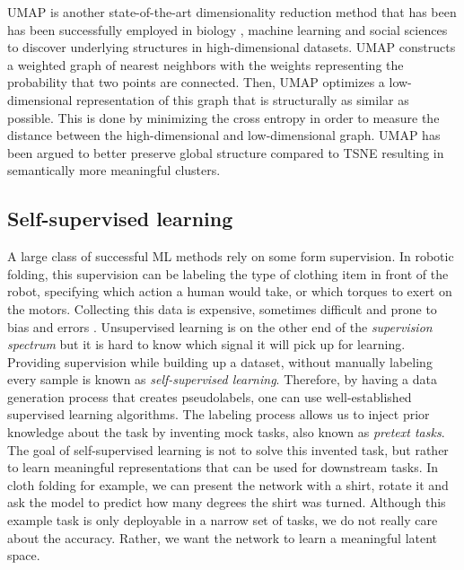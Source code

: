 \documentclass[\home/main.tex]{subfiles}
\begin{document}
\Gls{UMAP} is another state-of-the-art dimensionality reduction method that has been has been successfully employed in biology \autocite{cao2019single}, machine learning \autocite{carter2019activation} and social sciences \autocite{diaz2019umap} to discover underlying structures in high-dimensional datasets. \Gls{UMAP} constructs a weighted graph of nearest neighbors with the weights representing the probability that two points are connected. Then, UMAP optimizes a low-dimensional representation of this graph that is structurally as similar as possible. This is done by minimizing the cross entropy in order to measure the distance between the high-dimensional and low-dimensional graph. \gls{UMAP} has been argued to better preserve global structure compared to \gls{TSNE} \autocite{becht2019dimensionality} resulting in semantically more meaningful clusters. 

\subsection{Self-supervised learning} \label{subsec:lit_ssl}
A large class of successful \gls{ML} methods rely on some form supervision. In robotic folding, this supervision can be labeling the type of clothing item in front of the robot, specifying which action a human would take, or which torques to exert on the motors. Collecting this data is expensive, sometimes difficult and prone to bias and errors \autocite{mehrabi2021survey}. Unsupervised learning is on the other end of the \textit{supervision spectrum} but it is hard to know which signal it will pick up for learning. Providing supervision while building up a dataset, without manually labeling every sample is known as \emph{self-supervised learning}. Therefore, by having a data generation process that creates pseudolabels, one can use well-established supervised learning algorithms. The labeling process allows us to inject prior knowledge about the task by inventing mock tasks, also known as \emph{pretext tasks}. The goal of self-supervised learning is not to solve this invented task, but rather to learn meaningful representations that can be used for downstream tasks. In cloth folding for example, we can present the network with a shirt, rotate it and ask the model to predict how many degrees the shirt was turned. Although this example task is only deployable in a narrow set of tasks, we do not really care about the accuracy. Rather, we want the network to learn a meaningful latent space.
\end{document}
